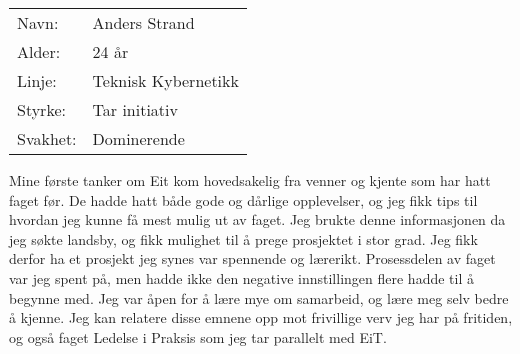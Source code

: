 \begin{table}[H]
\begin{tabular}{l l}
        Navn: & Anders Strand \\
        Alder: & 24 år \\ 
        Linje: & Teknisk Kybernetikk \\
        Styrke: & Tar initiativ \\
        Svakhet: & Dominerende
    \end{tabular}
\end{table}

Mine første tanker om Eit kom hovedsakelig fra venner og kjente som har hatt faget før.
De hadde hatt både gode og dårlige opplevelser, og jeg fikk tips til hvordan jeg kunne få mest mulig ut av faget. 
Jeg brukte denne informasjonen da jeg søkte landsby, og fikk mulighet til å prege prosjektet i stor grad. 
Jeg fikk derfor ha et prosjekt jeg synes var spennende og lærerikt.
Prosessdelen av faget var jeg spent på, men hadde ikke den negative innstillingen flere hadde til å begynne med. 
Jeg var åpen for å lære mye om samarbeid, og lære meg selv bedre å kjenne. 
Jeg kan relatere disse emnene opp mot frivillige verv jeg har på fritiden, og også faget Ledelse i Praksis som jeg tar parallelt med EiT.
